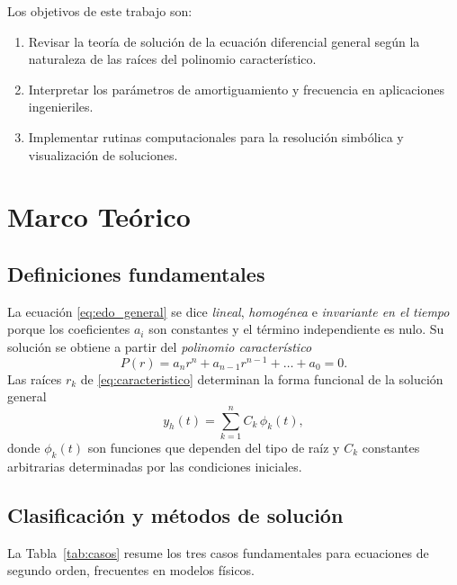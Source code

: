 \documentclass[stu,12pt,a4paper,hidelinks]{apa7}
\begin{document}
Los objetivos de este trabajo son:
\begin{enumerate}[label=\alph*)]
  \item Revisar la teoría de solución de la ecuación diferencial general según la naturaleza de las raíces del polinomio característico.
  \item Interpretar los parámetros de amortiguamiento y frecuencia en aplicaciones ingenieriles.
  \item Implementar rutinas computacionales para la resolución simbólica y visualización de soluciones.
\end{enumerate}

\section{Marco Teórico}

\subsection{Definiciones fundamentales}
La ecuación \eqref{eq:edo_general} se dice \emph{lineal}, \emph{homogénea} e \emph{invariante en el tiempo} porque los coeficientes $a_i$ son constantes y el término independiente es nulo. Su solución se obtiene a partir del \emph{polinomio característico}
\begin{equation}\label{eq:caracteristico}
P(r)=a_n r^n + a_{n-1} r^{n-1} + \dots + a_0 = 0.
\end{equation}
Las raíces $r_k$ de \eqref{eq:caracteristico} determinan la forma funcional de la solución general
\begin{equation}\label{eq:sol_general}
y_h(t)=\sum_{k=1}^{n} C_k \, \phi_k(t),
\end{equation}
donde $\phi_k(t)$ son funciones que dependen del tipo de raíz y $C_k$ constantes arbitrarias determinadas por las condiciones iniciales.

\subsection{Clasificación y métodos de solución}
La Tabla~\ref{tab:casos} resume los tres casos fundamentales para ecuaciones de segundo orden, frecuentes en modelos físicos.
\end{document}
